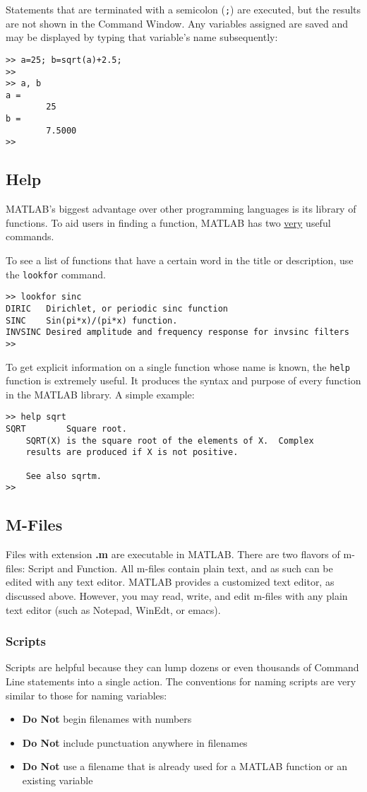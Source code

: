 \par
Statements that are terminated with a semicolon (\verb=;=) are executed, but the results are not shown in the Command Window.  Any variables assigned are saved and may be displayed by typing that variable's name subsequently:
\begin{verbatim}
>> a=25; b=sqrt(a)+2.5;
>>
>> a, b
a =
        25
b =
        7.5000
>>
\end{verbatim}

\subsection{Help}
MATLAB's biggest advantage over other programming languages is its library of functions.  To aid users in finding a function, MATLAB has two \uline{very} useful commands.
\par
To see a list of functions that have a certain word in the title or description, use the \verb=lookfor= command.
\begin{verbatim}
>> lookfor sinc
DIRIC   Dirichlet, or periodic sinc function
SINC    Sin(pi*x)/(pi*x) function.
INVSINC Desired amplitude and frequency response for invsinc filters
>>
\end{verbatim}
\par
To get explicit information on a single function whose name is known, the \verb=help= function is extremely useful.  It produces the syntax and purpose of every function in the MATLAB library.  A simple example:
\begin{verbatim}
>> help sqrt
SQRT        Square root.
    SQRT(X) is the square root of the elements of X.  Complex
    results are produced if X is not positive.

    See also sqrtm.
>>
\end{verbatim}

\subsection{M-Files}
Files with extension \textbf{.m} are executable in MATLAB.  There are two flavors of m-files: Script and Function.  All m-files contain plain text, and as such can be edited with any text editor.  MATLAB provides a customized text editor, as discussed above.  However, you may read, write, and edit m-files with any plain text editor (such as Notepad, WinEdt, or emacs).

\subsubsection{Scripts}
Scripts are helpful because they can lump dozens or even thousands of Command Line statements into a single action.  The conventions for naming scripts are very similar to those for naming variables:
\begin{itemize}
    \item \textbf{Do Not} begin filenames with numbers
    \item \textbf{Do Not} include punctuation anywhere in filenames
    \item \textbf{Do Not} use a filename that is already used for a MATLAB function or an existing variable
\end{itemize}


